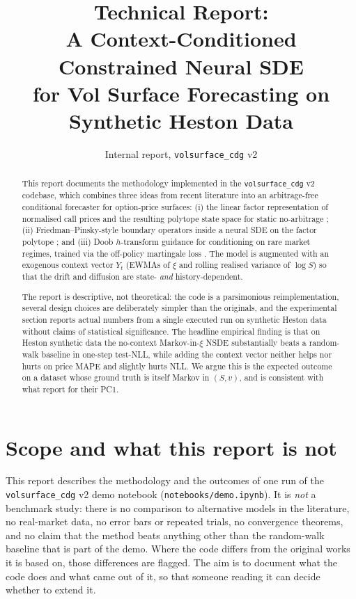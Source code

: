 \documentclass[11pt]{article}
\title{Technical Report:\\
A Context-Conditioned Constrained Neural SDE \\for Vol Surface Forecasting on Synthetic Heston Data}
\author{Internal report, \texttt{volsurface\_cdg} v2}
\date{}
\newcommand{\1}{\mathbf{1}}
\begin{document}
\maketitle

\begin{abstract}
\noindent
This report documents the methodology implemented in the \texttt{volsurface\_cdg} v2 codebase, which combines three ideas from recent literature into an arbitrage-free conditional forecaster for option-price surfaces: (i) the linear factor representation of normalised call prices and the resulting polytope state space for static no-arbitrage \citep{cohen2021}; (ii) Friedman--Pinsky-style boundary operators inside a neural SDE on the factor polytope \citep{cohen2021,friedman1973}; and (iii) Doob $h$-transform guidance for conditioning on rare market regimes, trained via the off-policy martingale loss \citep{guo2026}. The model is augmented with an exogenous context vector $Y_t$ (EWMAs of $\xi$ and rolling realised variance of $\log S$) so that the drift and diffusion are state- \emph{and} history-dependent.

The report is descriptive, not theoretical: the code is a parsimonious reimplementation, several design choices are deliberately simpler than the originals, and the experimental section reports actual numbers from a single executed run on synthetic Heston data without claims of statistical significance. The headline empirical finding is that on Heston synthetic data the no-context Markov-in-$\xi$ NSDE substantially beats a random-walk baseline in one-step test-NLL, while adding the context vector neither helps nor hurts on price MAPE and slightly hurts NLL. We argue this is the expected outcome on a dataset whose ground truth is itself Markov in $(S, v)$, and is consistent with what \citet{cohen2021} report for their PC1.
\end{abstract}

\section{Scope and what this report is not}

This report describes the methodology and the outcomes of one run of the \texttt{volsurface\_cdg} v2 demo notebook (\texttt{notebooks/demo.ipynb}). It is \emph{not} a benchmark study: there is no comparison to alternative models in the literature, no real-market data, no error bars or repeated trials, no convergence theorems, and no claim that the method beats anything other than the random-walk baseline that is part of the demo. Where the code differs from the original works it is based on, those differences are flagged. The aim is to document what the code does and what came out of it, so that someone reading it can decide whether to extend it.
\end{document}
